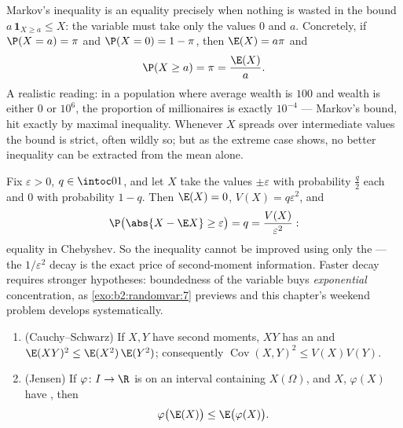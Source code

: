 \begin{example}\label{ex:b2:randomvar:markovsharp}
Markov's inequality is an equality precisely when nothing is
wasted in the bound $a\,\mathbf 1_{X\geq a} \leq X$: the
variable must take only the values $0$ and $a$. Concretely,
if $\P(X = a) = \pi$ and $\P(X = 0) = 1 - \pi$, then $\E(X)
= a\pi$ and
\[
\P(X \geq a) = \pi = \frac{\E(X)}{a} .
\]
A realistic reading: in a population where average wealth is
$100$ and wealth is either $0$ or $10^6$, the proportion of
millionaires is exactly $10^{-4}$ --- Markov's bound, hit
exactly by maximal inequality. Whenever $X$ spreads over
intermediate values the bound is strict, often wildly so;
but as the extreme case shows, no better inequality can be
extracted from the mean alone.
\end{example}

\begin{example}\label{ex:b2:randomvar:chebsharp}
Fix $\varepsilon > 0$, $q \in \intoc01$, and let $X$ take the
values $\pm\varepsilon$ with probability $\frac q2$ each and
$0$ with probability $1 - q$. Then $\E(X) = 0$, $V(X) =
q\varepsilon^2$, and
\[
\P\bigl(\abs{X - \E X} \geq \varepsilon\bigr) = q
= \frac{V(X)}{\varepsilon^2} :
\]
equality in Chebyshev. So the inequality cannot be improved
using only the  --- the $1/\varepsilon^2$ decay is
the exact price of second-moment information. Faster decay
requires stronger hypotheses: boundedness of the variable
buys \emph{exponential} concentration, as
\cref{exo:b2:randomvar:7} previews and this chapter's weekend
problem develops systematically.
\end{example}

\begin{theorem}\label{thm:b2:randomvar:jensen}
\leavevmode
\begin{enumerate}
\item (Cauchy--Schwarz) If $X, Y$ have second moments, $XY$ has an
 and $\E(XY)^2 \leq \E(X^2)\,\E(Y^2)$; consequently
$\operatorname{Cov}(X,Y)^2 \leq V(X)V(Y)$.
\item (Jensen) If $\varphi \colon I \to \R$ is  on an
interval containing $X(\Omega)$, and $X$, $\varphi(X)$ have
, then
\[
\varphi\bigl(\E(X)\bigr) \leq \E\bigl(\varphi(X)\bigr) .
\]
\end{enumerate}
\end{theorem}

